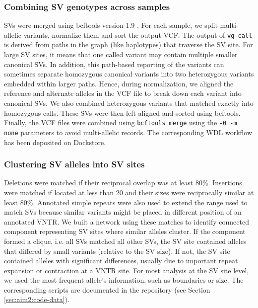 \documentclass[11pt]{ucscthesis}
\begin{document}
\subsubsection{Combining SV genotypes across samples}
\label{subsec:aim2:svcombining}

SVs were merged using bcftools version 1.9 \cite{li_samtools_2011}.
For each sample, we split multi-allelic variants, normalize them and sort the output VCF.
The output of \texttt{vg~call} is derived from paths in the graph (like haplotypes) that traverse the SV site.
For large SV sites, it means that one called variant may contain multiple smaller canonical SVs.
In addition, this path-based reporting of the variants can sometimes separate homozygous canonical variants into two heterozygous variants embedded within larger paths.
Hence, during normalization, we aligned the reference and alternate alleles in the VCF file to break down each variant into canonical SVs.
We also combined heterozygous variants that matched exactly into homozygous calls.
These SVs were then left-aligned and sorted using bcftools.
Finally, the VCF files were combined using \texttt{bcftools merge} using the \verb~-0 -m none~ parameters to avoid multi-allelic records.
The corresponding WDL workflow has been deposited on Dockstore\cite{svmerge_dockstore}.


\subsubsection{Clustering SV alleles into SV sites}
\label{subsec:aim2:svclustering}

Deletions were matched if their reciprocal overlap was at least 80\%.
Insertions were matched if located at less than 20 and their sizes were reciprocally similar at least 80\%.
Annotated simple repeats were also used to extend the range used to match SVs because similar variants might be placed in different position of an annotated VNTR.
We built a network using these matches to identify connected component representing SV sites where similar alleles cluster.
If the component formed a clique, i.e. all SVs matched all other SVs, the SV site contained alleles that differed by small variants (relative to the SV size).
If not, the SV site contained alleles with significant differences, usually due to important repeat expansion or contraction at a VNTR site.
For most analysis at the SV site level, we used the most frequent allele's information, such as boundaries or size.
The corresponding scripts are documented in the repository (see Section \ref{sec:aim2:code-data}).
\end{document}
